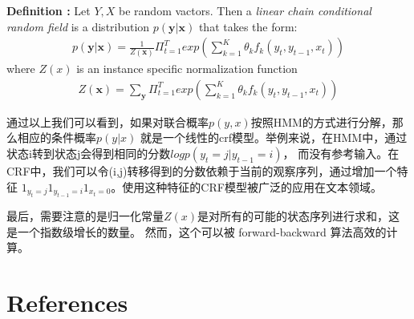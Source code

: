 \documentclass[UTF8]{ctexart}
\begin{document}
\par
\textbf{Definition : } Let $Y, X$ be random vactors. Then a \textit{linear 
chain conditional random field} is a distribution $p(\textbf{y}|\textbf{x})$
that takes the form:
\begin{align}
p(\textbf{y} | \textbf{x}) = \frac{1}{Z(\textbf{x})} \Pi_{t=1}^T
exp( \sum_{k=1}^K \theta_k f_k(y_t, y_{t-1}, x_t) )
\end{align}
where $Z(x)$ is an instance specific normalization function
\begin{align}
Z(\textbf{x}) = \sum_{\textbf{y}} \Pi_{t=1}^T
exp( \sum_{k=1}^K \theta_k f_k(y_t, y_{t-1}, x_t) )
\end{align}

\par
通过以上我们可以看到，如果对联合概率$p(y,x)$按照HMM的方式进行分解，那么相应的条件概率$p(y|x)$
就是一个线性的crf模型。举例来说，在HMM中，通过状态i转到状态j会得到相同的分数$log p(y_t=j|y_{t-1}=i)$，
而没有参考输入。在CRF中，我们可以令(i,j)转移得到的分数依赖于当前的观察序列，通过增加一个特征
$1_{y_t=j}1_{y_{t-1}=i}1_{x_t=0}$。使用这种特征的CRF模型被广泛的应用在文本领域。

\par
最后，需要注意的是归一化常量$Z(x)$是对所有的可能的状态序列进行求和，这是一个指数级增长的数量。
然而，这个可以被 forward-backward 算法高效的计算。

\section{References}
\end{document}
